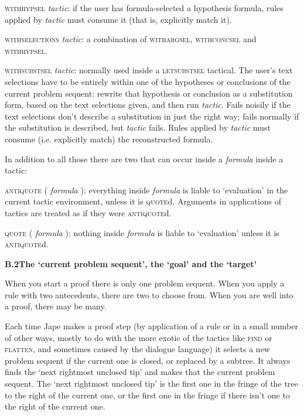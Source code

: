 \documentclass[11pt]{book}
\newcommand{\tab}{\hspace{5mm}}
\begin{document}
\textsc{withhypsel} \textit{tactic}: if the user has formula-selected a hypothesis formula, rules applied by \textit{tactic} must consume it (that is, explicitly match it).


\textsc{withselections} \textit{tactic}: a combination of \textsc{withargsel}, \textsc{withconcsel} and \textsc{withhypsel}.


\textsc{withsubstsel} \textit{tactic}: normally used inside a \textsc{letsubstsel} tactical. The user's text selections have to be entirely within one of the hypotheses or conclusions of the current problem sequent: rewrite that hypothesis or conclusion as a substitution form, based on the text selections given, and then run \textit{tactic}. Fails noisily if the text selections don't describe a substitution in just the right way; fails normally if the substitution is described, but \textit{tactic} fails. Rules applied by \textit{tactic} must consume (i.e. explicitly match) the reconstructed formula.


In addition to all those there are two that can occur inside a \textit{formula} inside a tactic:


\textsc{antiquote} ( \textit{formula} ): everything inside \textit{formula} is liable to `evaluation' in the current tactic environment, unless it is \textsc{quote}d. Arguments in applications of tactics are treated as if they were \textsc{antiquote}d.


\textsc{quote} ( \textit{formula} ): nothing inside \textit{formula} is liable to `evaluation' unless it is \textsc{antiquote}d.


\textbf{{\large B.2\tab The `current problem sequent', the `goal' and the `target'}}


When you start a proof there is only one problem sequent. When you apply a rule with two antecedents, there are two to choose from. When you are well into a proof, there may be many.


Each time Jape makes a proof step (by application of a rule or in a small number of other ways, mostly to do with the more exotic of the tactics like \textsc{find} or \textsc{flatten}, and sometimes caused by the dialogue language) it selects a new problem sequent if the current one is closed, or replaced by a subtree. It always finds the `next rightmost unclosed tip' and makes that the current problem sequent. The `next rightmost unclosed tip' is the first one in the fringe of the tree to the right of the current one, or the first one in the fringe if there isn't one to the right of the current one.
\end{document}
